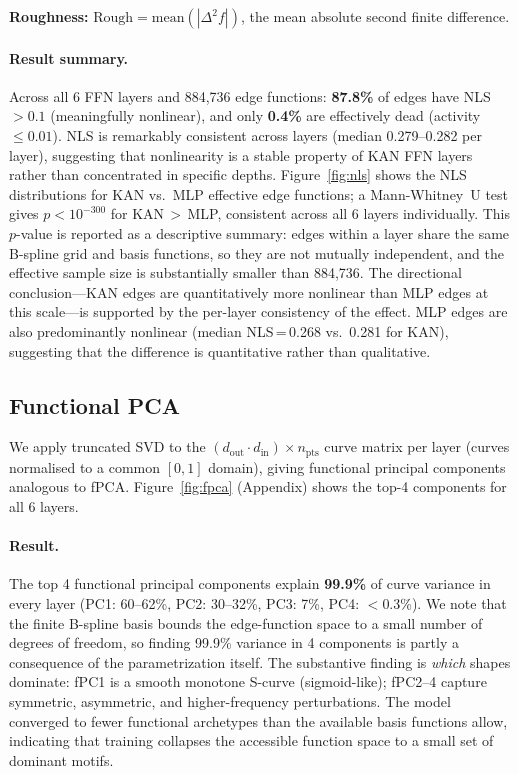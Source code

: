\documentclass{article}
\begin{document}
\textbf{Roughness:}
$\text{Rough} = \text{mean}(|\Delta^2 f|)$, the mean absolute second finite
difference.

\paragraph{Result summary.}
Across all 6 FFN layers and 884,736 edge functions:
\textbf{87.8\%} of edges have NLS $>0.1$ (meaningfully nonlinear),
and only \textbf{0.4\%} are effectively dead (activity $\leq 0.01$).
NLS is remarkably consistent across layers (median 0.279–0.282 per layer),
suggesting that nonlinearity is a stable property of KAN FFN layers rather
than concentrated in specific depths.
Figure~\ref{fig:nls} shows the NLS distributions for KAN vs.\ MLP
effective edge functions; a Mann-Whitney~U test gives $p < 10^{-300}$ for
KAN\,$>$\,MLP, consistent across all 6 layers individually.
This $p$-value is reported as a descriptive summary: edges within a layer share
the same B-spline grid and basis functions, so they are not mutually independent,
and the effective sample size is substantially smaller than 884,736.
The directional conclusion---KAN edges are quantitatively more nonlinear than MLP
edges at this scale---is supported by the per-layer consistency of the effect.
MLP edges are also predominantly nonlinear (median NLS\,=\,0.268 vs.\ 0.281 for KAN),
suggesting that the difference is quantitative rather than qualitative.

\subsection{Functional PCA}

We apply truncated SVD to the $(d_\text{out}\!\cdot d_\text{in}) \times n_\text{pts}$
curve matrix per layer (curves normalised to a common $[0,1]$ domain),
giving functional principal components analogous to fPCA.
Figure~\ref{fig:fpca} (Appendix) shows the top-4 components for all 6 layers.

\paragraph{Result.}
The top 4 functional principal components explain \textbf{99.9\%} of curve variance
in every layer (PC1: 60--62\%, PC2: 30--32\%, PC3: 7\%, PC4: $<$0.3\%).
We note that the finite B-spline basis bounds the edge-function space to a
small number of degrees of freedom, so finding 99.9\% variance in 4 components
is partly a consequence of the parametrization itself.
The substantive finding is \emph{which} shapes dominate: fPC1 is a smooth
monotone S-curve (sigmoid-like); fPC2--4 capture symmetric, asymmetric, and
higher-frequency perturbations.
The model converged to fewer functional archetypes than the available basis
functions allow, indicating that training collapses the accessible function
space to a small set of dominant motifs.
\end{document}
